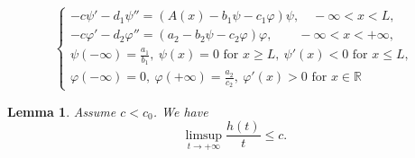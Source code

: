 \documentclass[10pt,a4paper]{amsart}
\newtheorem{lemma}{Lemma}
\begin{document}
			\begin{equation}
				\begin{cases}
					-c \psi' - d_1 \psi'' = (A(x) - b_1\psi - c_1\varphi)\psi, \quad-\infty < x < L,\\
					-c \varphi' - d_2 \varphi'' = (a_2 - b_2\psi - c_2\varphi)\varphi, \qquad -\infty < x < +\infty,\\
					\psi(-\infty) = \frac{a_1}{b_1}, ~ \psi(x)=0 \text{ for } x\ge L, ~ \psi'(x)<0 \text{ for } x\le L,\\	
					\varphi(-\infty) = 0, ~ \varphi(+\infty)=\frac{a_2}{c_2}, ~ \varphi'(x)>0 \text{ for } x\in\mathbb{R}
				\end{cases}			
			\end{equation}

	\begin{lemma}\label{lem:limsup} Assume $c < c_0$. We have
		\[
		\limsup_{t \to +\infty} \frac{h(t)}{t} \le c.
		\]
	\end{lemma}
\end{document}
